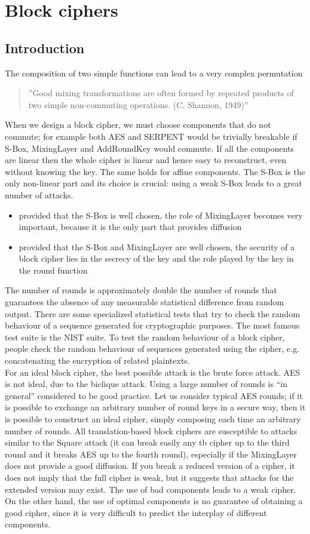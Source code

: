 \documentclass[a4paper, 10pt, titlepage]{article}
\begin{document}
\newpage
\section{Block ciphers}
\subsection{Introduction}
The composition of two simple functions can lead to a very complex
permutation
\begin{quote}
”Good mixing transformations are often formed by repeated
products of two simple non-commuting operations.
(C. Shannon, 1949)” 
\end{quote}
When we design a block cipher, we must choose components that do not commute; for example both AES and SERPENT would be trivially breakable if S-Box, MixingLayer and AddRoundKey would commute.
If all the components are linear then the whole cipher is linear and hence easy to reconstruct, even without knowing the key. The same holds for affine components. The S-Box is the only non-linear part and its choice is crucial: using a weak S-Box leads to a great number of attacks.
\begin{itemize}
\item provided that the S-Box is well chosen, the role of MixingLayer becomes very important, because it is the only part that provides diffusion
\item provided that the S-Box and MixingLayer are well chosen, the security of a block cipher lies in the secrecy of the key and the role played by the key in the round function
\end{itemize}
The number of rounds is approximately double the number of rounds
that guarantees the absence of any measurable statistical difference
from random output. There are some specialized statistical tests that try to check the random behaviour of a sequence generated for cryptographic purposes. The most famous test suite is the NIST suite. To test the random behaviour of a block cipher, people check the random behaviour of sequences generated using the cipher, e.g. concatenating the encryption of related plaintexts. \\ 
For an ideal block cipher, the best possible attack is the brute force attack.
AES is not ideal, due to the biclique attack. Using a large number of rounds is “in general” considered to be good practice.
Let us consider typical AES rounds; if it is possible to exchange an arbitrary number of round keys in a secure way, then it is possible to construct an ideal cipher, simply composing each time an arbitrary number of rounds. All translation-based block ciphers are susceptible to attacks similar to the Square attack (it can break easily any tb cipher up to the third round and it breaks AES up to the fourth round), especially if the MixingLayer does not provide a good diffusion. If you break a reduced version of a cipher, it does not imply that the full cipher is weak, but it suggests that attacks for the extended version may exist. The use of bad components leads to a weak cipher. On the other hand, the use of optimal components is no guarantee of obtaining a good cipher, since it is very difficult to predict the interplay of different components.
\end{document}
